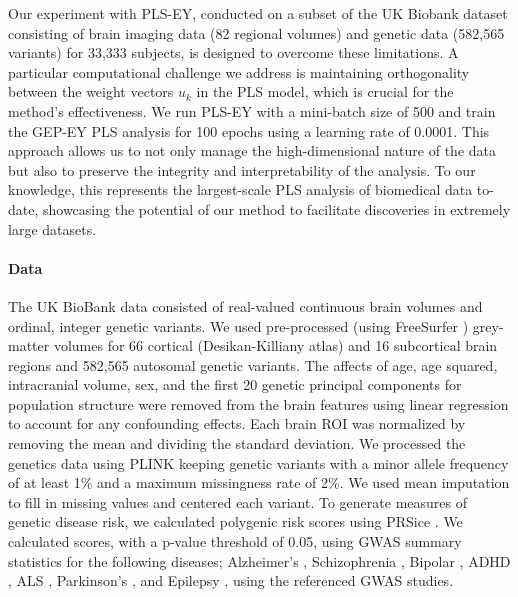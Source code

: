Our experiment with PLS-EY, conducted on a subset of the UK Biobank dataset consisting of brain imaging data (82 regional volumes) and genetic data (582,565 variants) for 33,333 subjects, is designed to overcome these limitations. A particular computational challenge we address is maintaining orthogonality between the weight vectors \( u_k \) in the PLS model, which is crucial for the method's effectiveness. We run PLS-EY with a mini-batch size of 500 and train the GEP-EY PLS analysis for 100 epochs using a learning rate of 0.0001. This approach allows us to not only manage the high-dimensional nature of the data but also to preserve the integrity and interpretability of the analysis. To our knowledge, this represents the largest-scale PLS analysis of biomedical data to-date, showcasing the potential of our method to facilitate discoveries in extremely large datasets.

\paragraph{Data} The UK BioBank data consisted of real-valued continuous brain volumes and ordinal, integer genetic variants.
We used pre-processed (using FreeSurfer \citep{Fischl2012}) grey-matter volumes for 66 cortical (Desikan-Killiany atlas) and 16 subcortical brain regions and 582,565 autosomal genetic variants.
The affects of age, age squared, intracranial volume, sex, and the first 20 genetic principal components for population structure were removed from the brain features using linear regression to account for any confounding effects.
Each brain ROI was normalized by removing the mean and dividing the standard deviation.
We processed the genetics data using PLINK \citep{Purcell2007} keeping genetic variants with a minor allele frequency of at least 1\%  and a maximum missingness rate of 2\%.
We used mean imputation to fill in missing values and centered each variant.
To generate measures of genetic disease risk, we calculated polygenic risk scores using PRSice \citep{PRSice2014}.
We calculated scores, with a p-value threshold of 0.05, using GWAS summary statistics for the following diseases; Alzheimer's \citep{Lambert2013}, Schizophrenia \citep{Trubetskoy2022}, Bipolar \citep{Mullins2021}, ADHD \citep{Demontis2023}, ALS \citep{Van_Rheenen2021}, Parkinson's \citep{Nalls2019}, and Epilepsy \citep{International_League_Against_Epilepsy_Consortium_on_Complex_Epilepsies2018}, using the referenced GWAS studies.

